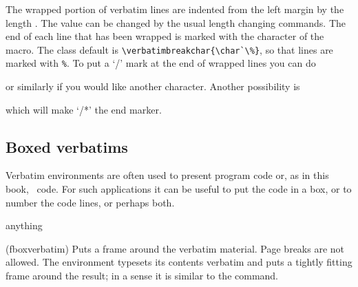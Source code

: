 {{{{   The wrapped portion of verbatim lines are indented from the left margin
by the length \lnc{\verbatimindent}. The value can be changed by the usual
length changing commands. The end of each line that has been wrapped is marked
with the  character of the \cmd{\verbatimbreakchar} macro.
The class default is \verb?\verbatimbreakchar{\char`\%}?, so that lines are 
marked with \verb?%?.
To put a `/' mark at the end of wrapped lines you can do
\begin{lcode}
\end{lcode}
or similarly if you would like another character. Another possibility
is
\begin{lcode}
\end{lcode}
which will make `/*' the end marker.

\subsection{Boxed verbatims}

    Verbatim environments are often used to present program code or, as
in this book, \ltx\ code. For such applications it can be useful to
put the code in a box, or to number the code lines, or perhaps both.

\begin{syntax}
 anything  \\
\end{syntax}
\glossary(fboxverbatim)%
  {}%
  {Puts a frame around the verbatim material. Page breaks are not allowed.}
The  environment 
typesets its contents verbatim and
puts a tightly fitting frame around the result; in a sense it is similar
to the \cmd{\fbox} command.

}}}}
